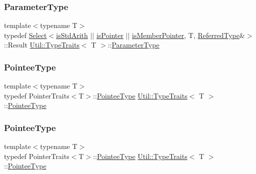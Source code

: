 \subsubsection{\texorpdfstring{ParameterType}{ParameterType}\hspace{0.1cm}{\footnotesize\ttfamily [2/2]}}
{\footnotesize\ttfamily template$<$typename T$>$ \\
typedef \mbox{\hyperlink{structUtil_1_1Select}{Select}}$<$\mbox{\hyperlink{classUtil_1_1TypeTraits_abfcd1f4b7a5011b6ea8b965d1b46e54ea3017f19abc6084d7e144891aaf5adb0f}{is\+Std\+Arith}} $\vert$$\vert$ \mbox{\hyperlink{classUtil_1_1TypeTraits_ad589492a3d9a9a4fd5154de3efb032c1a0813f58ed7af0a00a07d0ba641cc3bba}{is\+Pointer}} $\vert$$\vert$ \mbox{\hyperlink{classUtil_1_1TypeTraits_aee8735f108bb235c2d59b8b823e04086abe04caa758890fee25930d96123265d2}{is\+Member\+Pointer}}, T, \mbox{\hyperlink{classUtil_1_1TypeTraits_a89aec1a9db97b7f70e59b6738c5df4f9}{Referred\+Type}}\&$>$\+::Result \mbox{\hyperlink{classUtil_1_1TypeTraits}{Util\+::\+Type\+Traits}}$<$ T $>$\+::\mbox{\hyperlink{classUtil_1_1TypeTraits_a36b64fb2fc53ff32a8465e8862632db6}{Parameter\+Type}}}

\mbox{\label{classUtil_1_1TypeTraits_aa964d0cd9ee331e0d2d814a33bb93614}} 
\subsubsection{\texorpdfstring{PointeeType}{PointeeType}\hspace{0.1cm}{\footnotesize\ttfamily [1/2]}}
{\footnotesize\ttfamily template$<$typename T$>$ \\
typedef Pointer\+Traits$<$T$>$\+::\mbox{\hyperlink{classUtil_1_1TypeTraits_aa964d0cd9ee331e0d2d814a33bb93614}{Pointee\+Type}} \mbox{\hyperlink{classUtil_1_1TypeTraits}{Util\+::\+Type\+Traits}}$<$ T $>$\+::\mbox{\hyperlink{classUtil_1_1TypeTraits_aa964d0cd9ee331e0d2d814a33bb93614}{Pointee\+Type}}}

\mbox{\label{classUtil_1_1TypeTraits_aa964d0cd9ee331e0d2d814a33bb93614}} 
\subsubsection{\texorpdfstring{PointeeType}{PointeeType}\hspace{0.1cm}{\footnotesize\ttfamily [2/2]}}
{\footnotesize\ttfamily template$<$typename T$>$ \\
typedef Pointer\+Traits$<$T$>$\+::\mbox{\hyperlink{classUtil_1_1TypeTraits_aa964d0cd9ee331e0d2d814a33bb93614}{Pointee\+Type}} \mbox{\hyperlink{classUtil_1_1TypeTraits}{Util\+::\+Type\+Traits}}$<$ T $>$\+::\mbox{\hyperlink{classUtil_1_1TypeTraits_aa964d0cd9ee331e0d2d814a33bb93614}{Pointee\+Type}}}

